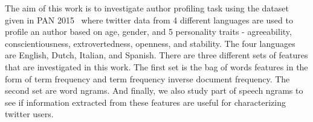 \documentclass[a4paper]{llncs}
\begin{document}
The aim of this work is to investigate author profiling task using the dataset given in PAN 2015~\cite{rangel:2015} where twitter data from 4 different languages are used to profile an author based on age, gender, and 5 personality traits - agreeability, conscientiousness, extrovertedness, openness, and stability. The four languages are English, Dutch, Italian, and Spanish. There are three different sets of features that are investigated in this work. The first set is the bag of words features in the form of term frequency and term frequency inverse document frequency. The second set are word ngrams. And finally, we also study part of speech ngrams to see if information extracted from these features are useful for characterizing twitter users.
%
%
%
\end{document}
